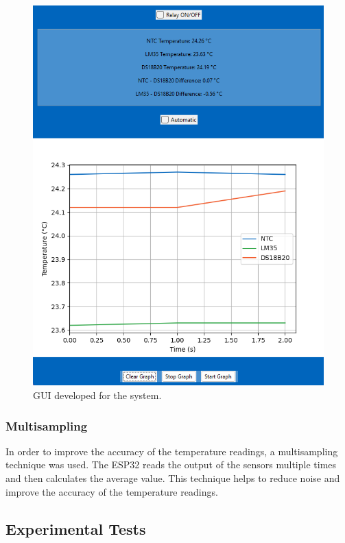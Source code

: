 \documentclass[12pt]{article}
\begin{document}
\begin{figure}[H] 
    \centering
    \includegraphics*[scale = 0.4]{images/gui.png}
    \caption{GUI developed for the system.}
    \label{fig:gui}
\end{figure}

\subsubsection{Multisampling}

In order to improve the accuracy of the temperature readings, a multisampling technique was used. The ESP32 reads the output of the sensors multiple times and then calculates the average value. This technique helps to reduce noise and improve the accuracy of the temperature readings.

\subsection{Experimental Tests}
\end{document}

